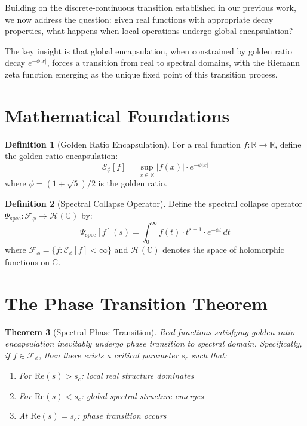 \documentclass[12pt]{article}
\theoremstyle{plain}
\newtheorem{theorem}{Theorem}[section]
\theoremstyle{definition}
\newtheorem{definition}[theorem]{Definition}
\begin{document}
Building on the discrete-continuous transition established in our previous work, we now address the question: given real functions with appropriate decay properties, what happens when local operations undergo global encapsulation?

The key insight is that global encapsulation, when constrained by golden ratio decay $e^{-\phi|x|}$, forces a transition from real to spectral domains, with the Riemann zeta function emerging as the unique fixed point of this transition process.

\section{Mathematical Foundations}

\begin{definition}[Golden Ratio Encapsulation]
For a real function $f: \mathbb{R} \to \mathbb{R}$, define the golden ratio encapsulation:
$$\mathcal{E}_\phi[f] = \sup_{x \in \mathbb{R}} |f(x)| \cdot e^{-\phi|x|}$$
where $\phi = (1+\sqrt{5})/2$ is the golden ratio.
\end{definition}

\begin{definition}[Spectral Collapse Operator]
Define the spectral collapse operator $\Psi_{\text{spec}}: \mathcal{F}_\phi \to \mathcal{H}(\mathbb{C})$ by:
$$\Psi_{\text{spec}}[f](s) = \int_0^{\infty} f(t) \cdot t^{s-1} \cdot e^{-\phi t} \, dt$$
where $\mathcal{F}_\phi = \{f : \mathcal{E}_\phi[f] < \infty\}$ and $\mathcal{H}(\mathbb{C})$ denotes the space of holomorphic functions on $\mathbb{C}$.
\end{definition}

\section{The Phase Transition Theorem}

\begin{theorem}[Spectral Phase Transition]
\label{thm:phase-transition}
Real functions satisfying golden ratio encapsulation inevitably undergo phase transition to spectral domain. Specifically, if $f \in \mathcal{F}_\phi$, then there exists a critical parameter $s_c$ such that:
\begin{enumerate}
\item For $\text{Re}(s) > s_c$: local real structure dominates
\item For $\text{Re}(s) < s_c$: global spectral structure emerges
\item At $\text{Re}(s) = s_c$: phase transition occurs
\end{enumerate}
\end{theorem}
\end{document}
